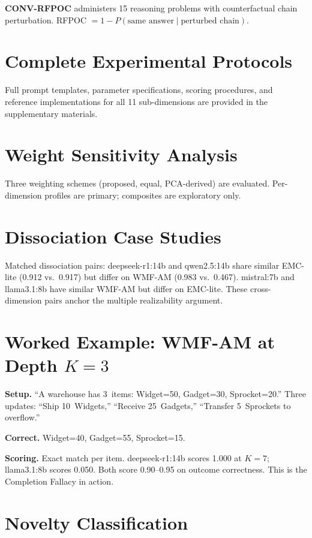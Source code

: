 \documentclass{article}
\begin{document}
\textbf{CONV-RFPOC} administers 15 reasoning problems with
counterfactual chain perturbation.
RFPOC $= 1 - P(\text{same answer} \mid \text{perturbed chain})$.

\section{Complete Experimental Protocols}
\label{app:protocols}

Full prompt templates, parameter specifications, scoring procedures, and
reference implementations for all 11 sub-dimensions are provided in the
supplementary materials.

\section{Weight Sensitivity Analysis}
\label{app:weights}

Three weighting schemes (proposed, equal, PCA-derived) are evaluated.
Per-dimension profiles are primary; composites are exploratory only.

\section{Dissociation Case Studies}
\label{app:dissociation}

Matched dissociation pairs: deepseek-r1:14b and qwen2.5:14b share
similar EMC-lite (0.912 vs.\ 0.917) but differ on WMF-AM (0.983 vs.\
0.467). mistral:7b and llama3.1:8b have similar WMF-AM but differ on
EMC-lite. These cross-dimension pairs anchor the multiple realizability
argument.

\section{Worked Example: WMF-AM at Depth $K{=}3$}
\label{app:worked}

\noindent\textbf{Setup.} ``A warehouse has 3~items: Widget=50,
Gadget=30, Sprocket=20.'' Three updates: ``Ship 10~Widgets,''
``Receive 25~Gadgets,'' ``Transfer 5~Sprockets to overflow.''

\noindent\textbf{Correct.} Widget=40, Gadget=55, Sprocket=15.

\noindent\textbf{Scoring.} Exact match per item. deepseek-r1:14b scores
1.000 at $K{=}7$; llama3.1:8b scores 0.050. Both score 0.90--0.95 on
outcome correctness. This is the Completion Fallacy in action.

\section{Novelty Classification}
\label{app:novelty}
\end{document}
